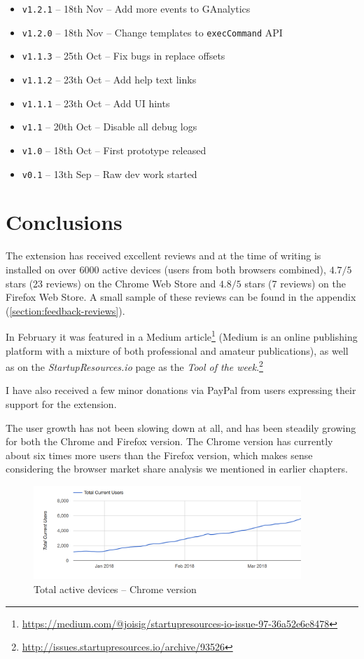 \documentclass[bsc,frontabs,twoside,singlespacing,parskip,deptreport]{infthesis}
\begin{document}
\begin{itemize}
\item
\texttt{v1.2.1} -- 18th Nov -- Add more events to GAnalytics
\item
\texttt{v1.2.0} -- 18th Nov -- Change templates to \texttt{execCommand} API
\item
\texttt{v1.1.3} -- 25th Oct -- Fix bugs in replace offsets
\item
\texttt{v1.1.2} -- 23th Oct -- Add help text links
\item
\texttt{v1.1.1} -- 23th Oct -- Add UI hints
\item
\texttt{v1.1} -- 20th Oct -- Disable all debug logs
\item
\texttt{v1.0} -- 18th Oct -- First prototype released
\item
\texttt{v0.1} -- 13th Sep -- Raw dev work started
\end{itemize}


\chapter{Conclusions}
\label{chapter:conclusions}

The extension has received excellent reviews and at the time of writing is installed on over 6000 active devices (users from both browsers combined), $4.7/5$ stars (23 reviews) on the Chrome Web Store and $4.8/5$ stars (7 reviews) on the Firefox Web Store. A small sample of these reviews can be found in the appendix (\autoref{section:feedback-reviews}).

In February it was featured in a Medium article\footnote{\url{https://medium.com/@joisig/startupresources-io-issue-97-36a52e6e8478}} (Medium is an online publishing platform with a mixture of both professional and amateur publications), as well as on the \textit{StartupResources.io} page as the \textit{Tool of the week}.\footnote{\url{http://issues.startupresources.io/archive/93526}}

I have also received a few minor donations via PayPal from users expressing their support for the extension.

The user growth has not been slowing down at all, and has been steadily growing for both the Chrome and Firefox version. The Chrome version has currently about six times more users than the Firefox version, which makes sense considering the browser market share analysis we mentioned in earlier chapters.

\begin{figure}[h]
\centering
\includegraphics[width=0.9\textwidth]{../docs/chrome-version-users.png}
\caption{Total active devices -- Chrome version}
\end{figure}
\end{document}
